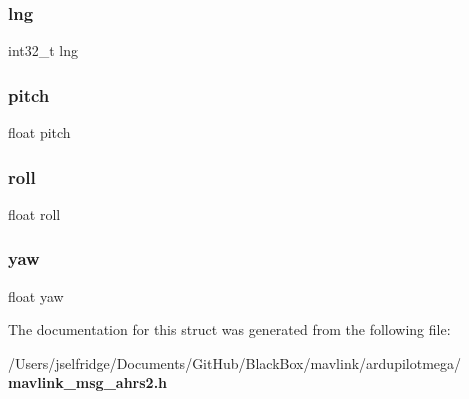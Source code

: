 \subsubsection{lng}
{\footnotesize\ttfamily int32\+\_\+t lng}

\mbox{\label{struct____mavlink__ahrs2__t_a282e7d4378d4a18a805b8980295ac86c}} 
\subsubsection{pitch}
{\footnotesize\ttfamily float pitch}

\mbox{\label{struct____mavlink__ahrs2__t_a26fd84d522945b6038221d9e38c7cc39}} 
\subsubsection{roll}
{\footnotesize\ttfamily float roll}

\mbox{\label{struct____mavlink__ahrs2__t_a7efc219781df4a1e281cb5d348b7fbf9}} 
\subsubsection{yaw}
{\footnotesize\ttfamily float yaw}



The documentation for this struct was generated from the following file\+:\begin{DoxyCompactItemize}
\item 
/\+Users/jselfridge/\+Documents/\+Git\+Hub/\+Black\+Box/mavlink/ardupilotmega/\textbf{ mavlink\+\_\+msg\+\_\+ahrs2.\+h}\end{DoxyCompactItemize}
